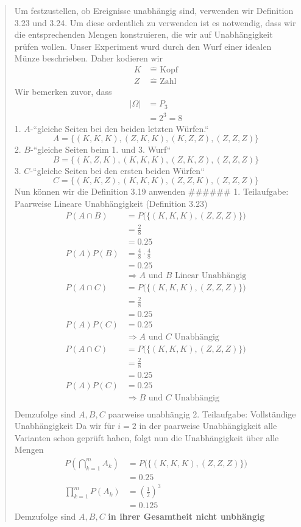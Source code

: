\documentclass[
]{article}
\begin{document}
\begin{quote}
Um festzustellen, ob Ereignisse unabhängig sind, verwenden wir
Definition 3.23 und 3.24. Um diese ordentlich zu verwenden ist es
notwendig, dass wir die entsprechenden Mengen konstruieren, die wir auf
Unabhängigkeit prüfen wollen. Unser Experiment wurd durch den Wurf einer
idealen Münze beschrieben. Daher kodieren wir \[\begin{align}
K &\;\widehat{=} \text{ Kopf} \\
Z &\; \widehat{=} \text{ Zahl}
\end{align}\] Wir bemerken zuvor, dass \[\begin{align}
\lvert \Omega \rvert&=P_{3}\\ &= 2^3 =8
\end{align}\] 1. \(A\)-``gleiche Seiten bei den beiden letzten Würfen.``
\[A = \{ (K,K,K), (Z,K,K), (K,Z,Z), (Z,Z,Z) \}\] 2. \(B\)-``gleiche
Seiten beim 1. und 3. Wurf``
\[B= \{ (K,Z,K), (K,K,K), (Z,K,Z), (Z,Z,Z) \}\] 3. \(C\)-``gleiche
Seiten bei den ersten beiden Würfen``
\[C= \{ (K,K,Z), (K,K,K), (Z,Z,K), (Z,Z,Z) \}\] Nun können wir die
Definition 3.19 anwenden \#\#\#\#\#\# 1. Teilaufgabe: Paarweise Lineare
Unabhängigkeit (Definition 3.23) \[\begin{align}
P(A \cap B) &= P\Big(\{ (K,K,K), (Z,Z,Z) \}\Big) \\
&= \frac{2}{8} \\
&= 0.25 \\
P(A)P(B) &= \frac{4}{8} \cdot \frac{4}{8} \\
&=0.25 \\
&\Rightarrow A \text{ und } B\text{ Linear Unabhängig} \\
P(A \cap C) &= P\Big(\{ (K,K,K), (Z,Z,Z) \}\Big) \\ 
&=\frac{2}{8} \\
&= 0.25 \\
P(A)P(C) &= 0.25 \\
&\Rightarrow A \text{ und } C\text{  Unabhängig} \\ 
P(A \cap C) &= P\Big(\{ (K,K,K), (Z,Z,Z) \}\Big) \\ 
&=\frac{2}{8} \\
&= 0.25 \\
P(A)P(C) &= 0.25 \\
&\Rightarrow B \text{ und } C\text{ Unabhängig} \\
\end{align}\] Demzufolge sind \(A,B,C\) paarweise unabhängig 2.
Teilaufgabe: Vollständige Unabhängigkeit Da wir für \(i=2\) in der
paarweise Unabhängigkeit alle Varianten schon geprüft haben, folgt nun
die Unabhängigkeit über alle Mengen \[\begin{align}
P\left( \bigcap_{k=1}^m A_{k} \right) &= P\Big(\{ (K,K,K), (Z,Z,Z) \}\Big) \\
&= 0.25 \\
\prod_{k=1}^m P(A_{k}) &= \left( \frac{1}{2} \right)^3 \\
           &= 0.125
\end{align}\] Demzufolge sind \(A,B,C\) \textbf{in ihrer Gesamtheit
nicht unbhängig}
\end{quote}
\end{document}
